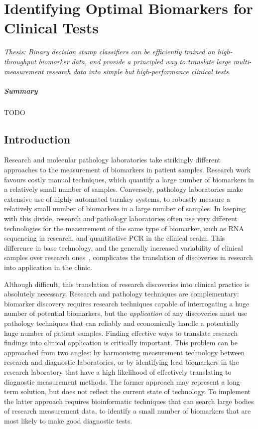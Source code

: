 \documentclass[dissertation.tex]{subfiles}
\begin{document}
\chapter[Identifying Optimal Biomarkers for Clinical Tests][Finding Optimal Biomarkers]{Identifying Optimal Biomarkers for Clinical Tests}
\label{chap:messina}


\emph{Thesis: Binary decision stump classifiers can be efficiently trained on high-throughput biomarker data, and provide a principled way to translate large multi-measurement research data into simple but high-performance clinical tests.}


\paragraph{Summary}
TODO

\section{Introduction}

Research and molecular pathology laboratories take strikingly different approaches to the measurement of biomarkers in patient samples.  Research work favours costly manual techniques, which quantify a large number of biomarkers in a relatively small number of samples.  Conversely, pathology laboratories make extensive use of highly automated turnkey systems, to robustly measure a relatively small number of biomarkers in a large number of samples.  In keeping with this divide, research and pathology laboratories often use very different technologies for the measurement of the same type of biomarker, such as RNA sequencing in research, and quantitative PCR in the clinical realm.  This difference in base technology, and the generally increased variability of clinical samples over research ones~\cite{Hewitt2008}, complicates the translation of discoveries in research into application in the clinic.

Although difficult, this translation of research discoveries into clinical practice is absolutely necessary.  Research and pathology techniques are complementary: biomarker discovery requires research techniques capable of interrogating a huge number of potential biomarkers, but the \emph{application} of any discoveries must use pathology techniques that can reliably and economically handle a potentially huge number of patient samples.  Finding effective ways to translate research findings into clinical application is critically important.  This problem can be approached from two angles: by harmonising measurement technology between research and diagnostic laboratories, or by identifying lead biomarkers in the research laboratory that have a high likelihood of effectively translating to diagnostic measurement methods.  The former approach may represent a long-term solution, but does not reflect the current state of technology.  To implement the latter approach requires bioinformatic techniques that can search large bodies of research measurement data, to identify a small number of biomarkers that are most likely to make good diagnostic tests.
\end{document}
